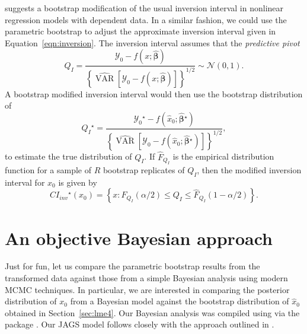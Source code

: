 \documentclass{article}\usepackage[]{graphicx}\usepackage[]{color}
\newcommand{\boot}{\ensuremath{^\star}}
\newcommand{\VAR}{\operatorname{VAR}}
\begin{document}
\citet{huet-statistical-2004} suggests a bootstrap modification of the usual inversion interval in nonlinear regression models with dependent data.  In a similar fashion, we could use the parametric bootstrap to adjust the approximate inversion interval given in Equation~\eqref{eqn:inversion}.  The inversion interval assumes that the \emph{predictive pivot}
\[
  Q_I = \frac{\mathcal{Y}_0-f\left(x; \widehat{\bm{\beta}}\right)}{\left\{ \widehat{\VAR}\left[\mathcal{Y}_0 - f\left(x; \widehat{\bm{\beta}}\right)\right] \right\}^{1/2}} \sim \mathcal{N}(0, 1).
\]
A bootstrap modified inversion interval would then use the bootstrap distribution of
\[
  Q_I\boot = \frac{\mathcal{Y}_0\boot-f\left(\widehat{x}_0; \widehat{\bm{\beta}}\boot\right)}{\left\{ \widehat{\VAR}\left[\mathcal{Y}_0 - f\left(\widehat{x}_0; \widehat{\bm{\beta}}\boot\right)\right] \right\}^{1/2}},
\]
to estimate the true distribution of $Q_I$.  If $\widehat{F}_{Q_I}$ is the empirical distribution function for a sample of $R$ bootstrap replicates of $Q_I$, then the modified inversion interval for $x_0$ is given by
\[
    CI_{inv}\boot\left(x_0\right) = \left\{ x: \widehat{F}_{Q_I}\left(\alpha/2\right) \le Q_I \le \widehat{F}_{Q_I}\left(1-\alpha/2\right) \right\}.
\]
\vspace{25pt}


\section{An objective Bayesian approach}
\label{sec:bayesian}

Just for fun, let us compare the parametric bootstrap results from the transformed data against those from a simple Bayesian analysis using modern MCMC techniques.  In particular, we are interested in comparing the posterior distribution of $x_0$ from a Bayesian model against the bootstrap distribution of $\widehat{x}_0$ obtained in Section~\ref{sec:lme4}.  Our Bayesian analysis was compiled using  \citep{plummer-jags-2003} via the  package  \citep{plummer-rjags-2014}.  Our JAGS model follows closely with the approach outlined in \citet{hamada-bayesian-2003}.
\end{document}
